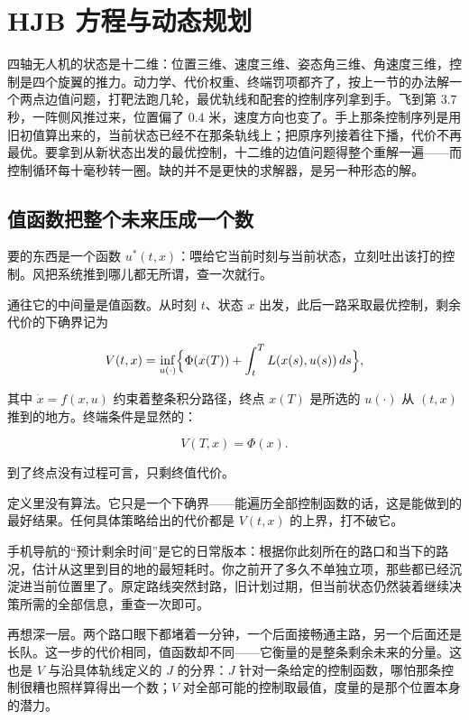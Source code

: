 \section{HJB 方程与动态规划}
\label{sec:16-Control-and-Reinforcement-Learning/01-Optimal-Control/03}

四轴无人机的状态是十二维：位置三维、速度三维、姿态角三维、角速度三维，控制是四个旋翼的推力。动力学、代价权重、终端罚项都齐了，按上一节的办法解一个两点边值问题，打靶法跑几轮，最优轨线和配套的控制序列拿到手。飞到第 \(3.7\) 秒，一阵侧风推过来，位置偏了 \(0.4\) 米，速度方向也变了。手上那条控制序列是用旧初值算出来的，当前状态已经不在那条轨线上；把原序列接着往下播，代价不再最优。要拿到从新状态出发的最优控制，十二维的边值问题得整个重解一遍——而控制循环每十毫秒转一圈。缺的并不是更快的求解器，是另一种形态的解。

\subsection{值函数把整个未来压成一个数}

要的东西是一个函数 \(u^*(t,x)\)：喂给它当前时刻与当前状态，立刻吐出该打的控制。风把系统推到哪儿都无所谓，查一次就行。

通往它的中间量是值函数。从时刻 \(t\)、状态 \(x\) 出发，此后一路采取最优控制，剩余代价的下确界记为

\[
V(t,x) = \inf_{u(\cdot)}
\Bigl\{ \Phi(x(T)) + \int_t^T L(x(s),u(s))\, ds \Bigr\},
\]

其中 \(\dot x = f(x,u)\) 约束着整条积分路径，终点 \(x(T)\) 是所选的 \(u(\cdot)\) 从 \((t,x)\) 推到的地方。终端条件是显然的：

\[
V(T,x) = \Phi(x).
\]

到了终点没有过程可言，只剩终值代价。

定义里没有算法。它只是一个下确界——能遍历全部控制函数的话，这是能做到的最好结果。任何具体策略给出的代价都是 \(V(t,x)\) 的上界，打不破它。

手机导航的``预计剩余时间''是它的日常版本：根据你此刻所在的路口和当下的路况，估计从这里到目的地的最短耗时。你之前开了多久不单独立项，那些都已经沉淀进当前位置里了。原定路线突然封路，旧计划过期，但当前状态仍然装着继续决策所需的全部信息，重查一次即可。

再想深一层。两个路口眼下都堵着一分钟，一个后面接畅通主路，另一个后面还是长队。这一步的代价相同，值函数却不同——它衡量的是整条剩余未来的分量。这也是 \(V\) 与沿具体轨线定义的 \(J\) 的分界：\(J\) 针对一条给定的控制函数，哪怕那条控制很糟也照样算得出一个数；\(V\) 对全部可能的控制取最值，度量的是那个位置本身的潜力。

